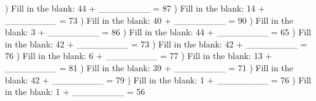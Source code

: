 \documentclass{article}%
\begin{document}
\newline%
) Fill in the blank: 44 + \_\_\_\_\_\_\_\_ = 87%
\newline%
\newline%
) Fill in the blank: 14 + \_\_\_\_\_\_\_\_ = 73%
\newline%
\newline%
) Fill in the blank: 40 + \_\_\_\_\_\_\_\_ = 90%
\newline%
\newline%
) Fill in the blank: 3 + \_\_\_\_\_\_\_\_ = 86%
\newline%
\newline%
) Fill in the blank: 44 + \_\_\_\_\_\_\_\_ = 65%
\newline%
\newline%
) Fill in the blank: 42 + \_\_\_\_\_\_\_\_ = 73%
\newline%
\newline%
) Fill in the blank: 42 + \_\_\_\_\_\_\_\_ = 76%
\newline%
\newline%
) Fill in the blank: 6 + \_\_\_\_\_\_\_\_ = 77%
\newline%
\newline%
) Fill in the blank: 13 + \_\_\_\_\_\_\_\_ = 81%
\newline%
\newline%
) Fill in the blank: 39 + \_\_\_\_\_\_\_\_ = 71%
\newline%
\newline%
) Fill in the blank: 42 + \_\_\_\_\_\_\_\_ = 79%
\newline%
\newline%
) Fill in the blank: 1 + \_\_\_\_\_\_\_\_ = 76%
\newline%
\newline%
) Fill in the blank: 1 + \_\_\_\_\_\_\_\_ = 56%
\newline%
\end{document}
